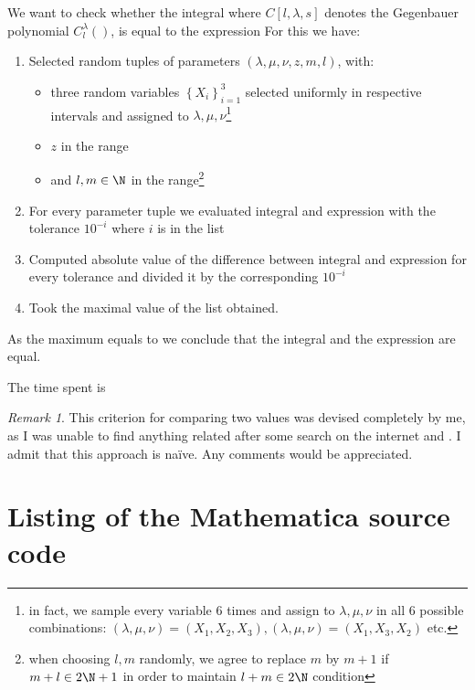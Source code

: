 \documentclass[12pt,a4paper]{article}
\theoremstyle{remark}
\newtheorem{remark}{Remark}
\begin{document}
We want to check whether the integral
where $C[l,\lambda,s]$ denotes the Gegenbauer polynomial $C^\lambda_l()$,
is equal to the expression
For this we have:
\begin{enumerate}
	\item 
Selected 
random tuples of parameters $(\lambda,\mu,\nu,z,m,l)$, with:\begin{itemize}
	\item 
		three random variables $\left\{ X_i \right\}_{i=1}^3$ selected uniformly in respective intervals
		and assigned to $\lambda,\mu,\nu$\footnote{in fact, we sample every variable 6 times and assign to $\lambda,\mu,\nu$ in all 6 possible combinations:
		$(\lambda,\mu,\nu)=\left( X_1,X_2,X_3 \right),\left( \lambda,\mu,\nu \right)=\left( X_1,X_3,X_2 \right)$ etc.}
	\item
$z$ in the range
	\item
and $l,m\in\N$ in the range\footnote{when choosing $l,m$ randomly, we agree to replace $m$ by $m+1$ if $m+l\in2\N+1$ in order to maintain $l+m\in2\N$ condition}

\end{itemize}
\item For every parameter tuple we evaluated integral and expression with the tolerance $10^{-i}$ where $i$ is in the list
\item Computed absolute value of the difference between integral and expression for every tolerance and divided it by the corresponding $10^{-i}$
\item Took the maximal value of the list obtained.
\end{enumerate}
As the maximum equals to
we conclude that the integral and the expression are equal.

The time spent is
	
\begin{remark}
	This criterion for comparing two values was devised completely by me, as I was unable to find anything related after some search on the internet and \cite{teukolsky1992numerical}.
	I admit that this approach is na\"ive. Any comments would be appreciated.
\end{remark}
	\appendix
	\section{Listing of the Mathematica source code}
	
	
	
\end{document}

